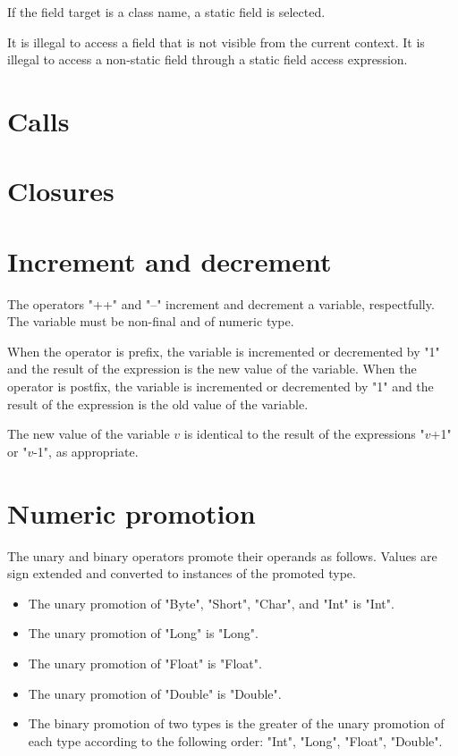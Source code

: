 If the field target is a class name, a static field is selected.

It is illegal to access  a field that is not visible from
the current context.
It is illegal to access a non-static field
through a static field access expression.

\section{Calls}
\label{MethodInvocation}
\label{MethodInvocationSubstitution}

\section{Closures}
\label{Closures}


\section{Increment and decrement}

The operators \xcd"++" and \xcd"--" increment and decrement
a variable, respectfully.  The variable must be non-final
and of numeric type.

When the operator is prefix, the variable is
incremented or decremented by \xcd"1" and the result of the expression is
the new value of the variable.
When the operator is postfix, the variable is incremented or
decremented by \xcd"1" and the result of the expression is the old value of
the variable.

The new value of the variable $v$ is identical to the result of
the expressions
\xcdmath"$v$+1" or \xcdmath"$v$-1", as appropriate.

\section{Numeric promotion}

The unary and binary operators promote their operands as
follows.
Values are sign extended and converted to instances of the
promoted type.

\begin{itemize}
\item  The unary promotion of \xcd"Byte", \xcd"Short",
\xcd"Char", and \xcd"Int" is \xcd"Int".
\item  The unary promotion of \xcd"Long" is \xcd"Long".
\item  The unary promotion of \xcd"Float" is \xcd"Float".
\item  The unary promotion of \xcd"Double" is \xcd"Double".
\item The binary promotion of two types is the  
greater of the unary promotion of each type
according to the following order:
\xcd"Int", \xcd"Long", \xcd"Float", \xcd"Double".
\end{itemize}

